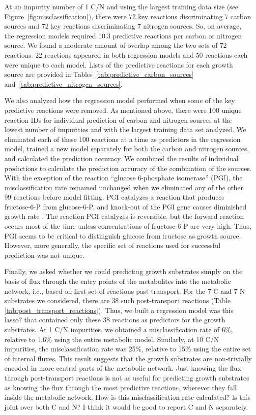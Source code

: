 \documentclass[12pt]{article}
\begin{document}
At an impurity number of 1 C/N and using the largest training data size (see Figure~\ref{fig:misclassification}), there were 72 key reactions discriminating 7 carbon sources and 72 key reactions discriminating 7 nitrogen sources. So, on average, the regression models required 10.3 predictive reactions per carbon or nitrogen source. We found a moderate amount of overlap among the two sets of 72 reactions. 22 reactions appeared in both regression models and 50 reactions each were unique to each model. Lists of the predictive reactions for each growth source are provided in Tables~\ref{tab:predictive_carbon_sources} and~\ref{tab:predictive_nitrogen_sources}.

We also analyzed how the regression model performed when some of the key predictive reactions were removed. As mentioned above, there were 100 unique reaction IDs for individual prediction of carbon and nitrogen sources at the lowest number of impurities and with the largest training data set analyzed. We eliminated each of these 100 reactions at a time as predictors in the regression model, trained a new model separately for both the carbon and nitrogen sources, and calculated the prediction accuracy. We combined the results of individual predictions to calculate the prediction accuracy of the combination of the sources. With the exception of the reaction ``glucose 6-phosphate isomerase'' (PGI), the misclassification rate remained unchanged when we eliminated any of the other 99 reactions before model fitting. PGI catalyzes a reaction that produces fructose-6-P from glucose-6-P, and knock-out of the PGI gene causes diminished growth rate \cite{Canonacoetal2001}. The reaction PGI catalyzes is reversible, but the forward reaction occurs most of the time unless concentrations of fructose-6-P are very high. Thus, PGI seems to be critical to distinguish glucose from fructose as growth source. However, more generally, the specific set of reactions used for successful prediction was not unique.

Finally, we asked whether we could predicting growth substrates simply on the basis of flux through the entry points of the metabolites into the metabolic network, i.e., based on first set of reactions past transport. For the 7 C and 7 N substrates we considered, there are 38 such post-transport reactions (Table \ref{tab:post_transport_reactions}). Thus, we built a regression model {\color{red}was this lasso?} that contained only these 38 reactions as predictors for the growth substrates. At 1 C/N impurities, we obtained a misclassification rate of  6\%, relative to 1.6\% using the entire metabolic model. Similarly, at 10 C/N impurities, the misclassification rate was 25\%, relative to 15\% using the entire set of internal fluxes. This result suggests that the growth substrates are non-trivially encoded in more central parts of the metabolic network. Just knowing the flux through post-transport reactions is not as useful for predicting growth substrates as knowing the flux through the most predictive reactions, wherever they fall inside the metabolic network. 
{\color{red}How is this misclassification rate calculated? Is this joint over both C and N? I think it would be good to report C and N separately.}
\end{document}
